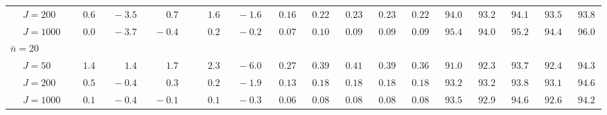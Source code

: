 \begin{sidewaystable}
\begin{threeparttable}
\begin{tabular}{llccccccccccccccc}
 & \nopagebreak $\;J=200$  & $\phantom{0}\phantom{-}0.6\phantom{0}$ & $\phantom{0}{-}3.5\phantom{0}$ & $\phantom{0}\phantom{-}0.7\phantom{0}$ & $\phantom{0}\phantom{-}1.6\phantom{0}$ & $\phantom{0}{-}1.6\phantom{0}$ & $\phantom{0}0.16\phantom{0}$ & $\phantom{0}0.22\phantom{0}$ & $\phantom{0}0.23\phantom{0}$ & $\phantom{0}0.23\phantom{0}$ & $\phantom{0}0.22\phantom{0}$ & $\phantom{0}94.0\phantom{0}$ & $\phantom{0}93.2\phantom{0}$ & $\phantom{0}94.1\phantom{0}$ & $\phantom{0}93.5\phantom{0}$ & $\phantom{0}93.8\phantom{0}$ \\
 & \nopagebreak $\;J=1000$  & $\phantom{0}\phantom{-}0.0\phantom{0}$ & $\phantom{0}{-}3.7\phantom{0}$ & $\phantom{0}{-}0.4\phantom{0}$ & $\phantom{0}\phantom{-}0.2\phantom{0}$ & $\phantom{0}{-}0.2\phantom{0}$ & $\phantom{0}0.07\phantom{0}$ & $\phantom{0}0.10\phantom{0}$ & $\phantom{0}0.09\phantom{0}$ & $\phantom{0}0.09\phantom{0}$ & $\phantom{0}0.09\phantom{0}$ & $\phantom{0}95.4\phantom{0}$ & $\phantom{0}94.0\phantom{0}$ & $\phantom{0}95.2\phantom{0}$ & $\phantom{0}94.4\phantom{0}$ & $\phantom{0}96.0\phantom{0}$ \\
\multicolumn{4}{l}{$\bar{n}=20$} \\  & \nopagebreak $\;J=50$  & $\phantom{0}\phantom{-}1.4\phantom{0}$ & $\phantom{0}\phantom{-}1.4\phantom{0}$ & $\phantom{0}\phantom{-}1.7\phantom{0}$ & $\phantom{0}\phantom{-}2.3\phantom{0}$ & $\phantom{0}{-}6.0\phantom{0}$ & $\phantom{0}0.27\phantom{0}$ & $\phantom{0}0.39\phantom{0}$ & $\phantom{0}0.41\phantom{0}$ & $\phantom{0}0.39\phantom{0}$ & $\phantom{0}0.36\phantom{0}$ & $\phantom{0}91.0\phantom{0}$ & $\phantom{0}92.3\phantom{0}$ & $\phantom{0}93.7\phantom{0}$ & $\phantom{0}92.4\phantom{0}$ & $\phantom{0}94.3\phantom{0}$ \\
 & \nopagebreak $\;J=200$  & $\phantom{0}\phantom{-}0.5\phantom{0}$ & $\phantom{0}{-}0.4\phantom{0}$ & $\phantom{0}\phantom{-}0.3\phantom{0}$ & $\phantom{0}\phantom{-}0.2\phantom{0}$ & $\phantom{0}{-}1.9\phantom{0}$ & $\phantom{0}0.13\phantom{0}$ & $\phantom{0}0.18\phantom{0}$ & $\phantom{0}0.18\phantom{0}$ & $\phantom{0}0.18\phantom{0}$ & $\phantom{0}0.18\phantom{0}$ & $\phantom{0}93.2\phantom{0}$ & $\phantom{0}93.2\phantom{0}$ & $\phantom{0}93.8\phantom{0}$ & $\phantom{0}93.1\phantom{0}$ & $\phantom{0}94.6\phantom{0}$ \\
 & \nopagebreak $\;J=1000$  & $\phantom{0}\phantom{-}0.1\phantom{0}$ & $\phantom{0}{-}0.4\phantom{0}$ & $\phantom{0}{-}0.1\phantom{0}$ & $\phantom{0}\phantom{-}0.1\phantom{0}$ & $\phantom{0}{-}0.3\phantom{0}$ & $\phantom{0}0.06\phantom{0}$ & $\phantom{0}0.08\phantom{0}$ & $\phantom{0}0.08\phantom{0}$ & $\phantom{0}0.08\phantom{0}$ & $\phantom{0}0.08\phantom{0}$ & $\phantom{0}93.5\phantom{0}$ & $\phantom{0}92.9\phantom{0}$ & $\phantom{0}94.6\phantom{0}$ & $\phantom{0}92.6\phantom{0}$ & $\phantom{0}94.2\phantom{0}$ \\

\end{tabular}
\end{threeparttable}
\end{sidewaystable}
